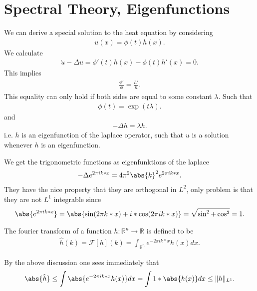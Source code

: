 \section{Spectral Theory, Eigenfunctions}
We can derive a special solution to the heat equation by considering 
\begin{align*}
  u(x) = \phi(t)h(x)
.\end{align*}
We calculate 
\begin{align*}
  \dot{u} - \Delta u =  \phi'(t)h(x) - \phi(t)h'(x) = 0 
.\end{align*}
This implies 
\begin{align*}
  \frac{\phi'}{\phi } = \frac{h'}{h}
.\end{align*}
This equality can only hold if both sides are equal to some constant $\lambda$.
Such that 
\begin{align*}
  \phi(t) = \exp(t\lambda )
.\end{align*}
and 
\begin{align*}
  -\Delta  h = \lambda  h
.\end{align*}
i.e. $h$ is an eigenfunction of the laplace operator, such that $u$ is a solution whenever $h$ is an eigenfunction.\\[1ex]
\begin{definition}
 We get the trigonometric functions as eigenfunktions  of the laplace
 \begin{align*}
  -\Delta  e^{2\pi ik*x} = 4\pi ^2 \abs{k}^2 e^{2\pi ik*x}  
 .\end{align*}
 They have the nice property that they are orthogonal in $L^2$, only problem is that they are not $L^{1}$ integrable since 
 \begin{align*}
   \abs{e^{2\pi ik*x} }= \abs{\sin(2\pi k*x) + i*\cos(2\pi ik*x)} = \sqrt{\sin^2+\cos^2}  = 1
 .\end{align*}
\end{definition}
\begin{Definition}[4.1]
 The fourier transform of a function $h: \mathbb{R}^{n} \to \mathbb{R}$ is defined to be 
 \begin{align*}
   \hat{h}(k)  = \mathcal{F}[h](k) = \int_{\mathbb{R}^{n} } e^{-2\pi ik*x}h(x)dx 
 .\end{align*}
\end{Definition}
\begin{corollary}
 By the above discussion one sees immediately that 
 \begin{align*}
   \abs{\hat{h} } \le  \int \abs{e^{-2\pi ik*x}h(x)} dx =  \int 1*\abs{h(x)} dx \le  \|h\|_{L^{1} }
 .\end{align*}
\end{corollary}
